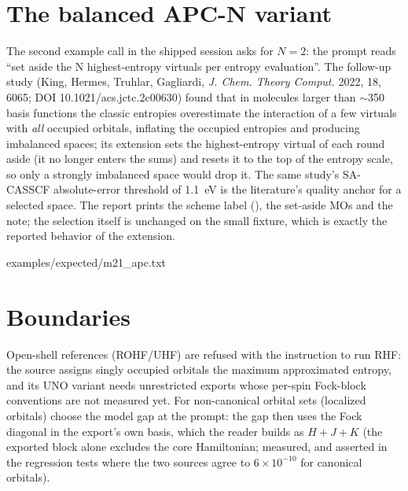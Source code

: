 \section{The balanced APC-N variant}

The second example call in the shipped session asks for $N = 2$: the
prompt reads ``set aside the N highest-entropy virtuals per entropy
evaluation''.  The follow-up study (King, Hermes, Truhlar, Gagliardi,
\emph{J. Chem. Theory Comput.} 2022, 18, 6065; DOI
10.1021/acs.jctc.2c00630) found that in molecules larger than $\sim$350
basis functions the classic entropies overestimate the interaction of a
few virtuals with \emph{all} occupied orbitals, inflating the occupied
entropies and producing imbalanced spaces; its extension sets the
highest-entropy virtual of each round aside (it no longer enters the
sums) and resets it to the top of the entropy scale, so only a strongly
imbalanced space would drop it.  The same study's SA-CASSCF absolute-error
threshold of 1.1~eV is the literature's quality anchor for a selected
space.  The report prints the scheme label (), the set-aside
MOs and the note; the selection itself is unchanged on the small fixture,
which is exactly the reported behavior of the extension.


  {examples/expected/m21_apc.txt}

\section{Boundaries}

Open-shell references (ROHF/UHF) are refused with the instruction to run RHF:
the source assigns singly occupied orbitals the maximum approximated entropy,
and its UNO variant needs unrestricted exports whose per-spin Fock-block
conventions are not measured yet.  For non-canonical orbital sets (localized
orbitals) choose the  model gap at the prompt: the gap then uses
the Fock diagonal in the export's own basis, which the reader builds as
$H + J + K$ (the exported  block alone excludes the core Hamiltonian;
measured, and asserted in the regression tests where the two sources agree to
$6\times10^{-10}$ for canonical orbitals).
